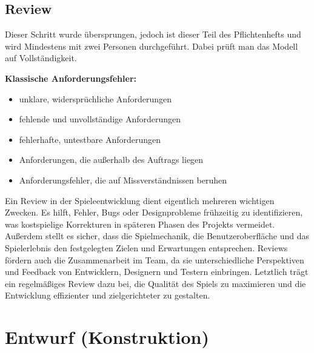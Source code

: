 \documentclass[a4paper,12pt]{article}
\begin{document}
\subsection{Review}
Dieser Schritt wurde übersprungen, jedoch ist dieser Teil des Pflichtenhefts und wird Mindestens mit zwei Personen durchgeführt. Dabei prüft man das Modell auf Vollständigkeit. \par \vspace\baselineskip
\textbf{Klassische Anforderungsfehler:}
\begin{itemize}[noitemsep,topsep=0pt,parsep=0pt,partopsep=0pt]
    \item unklare, widersprüchliche Anforderungen
    \item fehlende und unvollständige Anforderungen
    \item fehlerhafte, untestbare Anforderungen
    \item Anforderungen, die außerhalb des Auftrags liegen
    \item Anforderungsfehler, die auf Missverständnissen beruhen
\end{itemize}
Ein Review in der Spieleentwicklung dient eigentlich mehreren wichtigen Zwecken. Es hilft, Fehler, Bugs oder Designprobleme frühzeitig zu identifizieren, was kostspielige Korrekturen in späteren Phasen des Projekts vermeidet. Außerdem stellt es sicher, dass die Spielmechanik, die Benutzeroberfläche und das Spielerlebnis den festgelegten Zielen und Erwartungen entsprechen. Reviews fördern auch die Zusammenarbeit im Team, da sie unterschiedliche Perspektiven und Feedback von Entwicklern, Designern und Testern einbringen. Letztlich trägt ein regelmäßiges Review dazu bei, die Qualität des Spiels zu maximieren und die Entwicklung effizienter und zielgerichteter zu gestalten.
\clearpage
\section{Entwurf (Konstruktion)}
\end{document}
